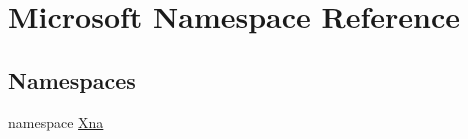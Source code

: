 \hypertarget{namespace_microsoft}{}\section{Microsoft Namespace Reference}
\label{namespace_microsoft}
\subsection*{Namespaces}
\begin{DoxyCompactItemize}
\item 
namespace \hyperlink{namespace_microsoft_1_1_xna}{Xna}
\end{DoxyCompactItemize}
